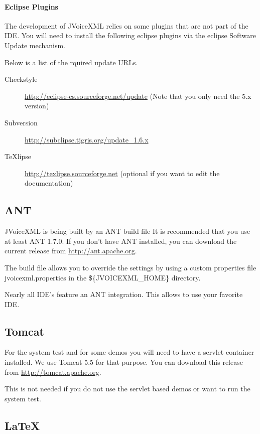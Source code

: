 \documentclass[11pt,a4paper]{article}
\begin{document}
\paragraph{Eclipse Plugins}

The development of JVoiceXML relies on some plugins that are not part of the
IDE. You will need to install the following eclipse plugins via the eclipse
Software Update mechanism.

Below is a list of the rquired update URLs.

\begin{description}
\item[Checkstyle] \url{http://eclipse-cs.sourceforge.net/update} (Note that you
only need the 5.x version)
\item[Subversion] \url{http://subclipse.tigris.org/update_1.6.x}
\item[TeXlipse] \url{http://texlipse.sourceforge.net} (optional if you want to
edit the documentation)
\end{description}

\subsection{ANT}
\label{sec:ant}

JVoiceXML is being built by an ANT build file It is recommended that
you use at least ANT 1.7.0. 
If you don't have ANT installed, you can download the current release
from \url{http://ant.apache.org}.

The build file allows you to override the settings by using a custom 
properties file jvoicexml.properties in the \$\{JVOICEXML\_HOME\}
directory.

Nearly all IDE's feature an ANT integration. This allows to use
your favorite IDE.

\subsection{Tomcat}
\label{sec:tomcat}

For the system test and for some demos you will need to have a servlet
container installed. We use Tomcat 5.5 for that purpose. You can download this
release from \url{http://tomcat.apache.org}.

This is not needed if you do not use the servlet based demos or want to run the
system test.

\subsection{\LaTeX}
\end{document}
